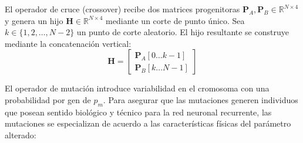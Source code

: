 El operador de cruce (crossover) recibe dos matrices progenitoras $\mathbf{P}_A, \mathbf{P}_B \in \mathbb{R}^{N \times 4}$ y genera un hijo $\mathbf{H} \in \mathbb{R}^{N \times 4}$ mediante un corte de punto único. Sea $k \in \{1, 2, \dots, N-2\}$ un punto de corte aleatorio. El hijo resultante se construye mediante la concatenación vertical:
\begin{equation}
    \mathbf{H} = \begin{bmatrix} \mathbf{P}_A[0 \dots k-1] \\ \mathbf{P}_B[k \dots N-1] \end{bmatrix}
\end{equation}

El operador de mutación introduce variabilidad en el cromosoma con una probabilidad por gen de $p_m$. Para asegurar que las mutaciones generen individuos que posean sentido biológico y técnico para la red neuronal recurrente, las mutaciones se especializan de acuerdo a las características físicas del parámetro alterado:
